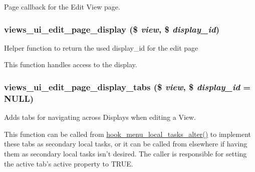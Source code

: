 \label{admin_8inc_ac6af463750fb21984d42b858c446635c}
Page callback for the Edit View page. \hypertarget{admin_8inc_a045ae05a3c8355d168425698b57a44ad}{
\subsubsection[{views\_\-ui\_\-edit\_\-page\_\-display}]{\setlength{\rightskip}{0pt plus 5cm}views\_\-ui\_\-edit\_\-page\_\-display (\$ {\em view}, \/  \$ {\em display\_\-id})}}
\label{admin_8inc_a045ae05a3c8355d168425698b57a44ad}
Helper function to return the used display\_\-id for the edit page

This function handles access to the display. \hypertarget{admin_8inc_af68377c9cd423a44378278947ce082c0}{
\subsubsection[{views\_\-ui\_\-edit\_\-page\_\-display\_\-tabs}]{\setlength{\rightskip}{0pt plus 5cm}views\_\-ui\_\-edit\_\-page\_\-display\_\-tabs (\$ {\em view}, \/  \$ {\em display\_\-id} = {\ttfamily NULL})}}
\label{admin_8inc_af68377c9cd423a44378278947ce082c0}
Adds tabs for navigating across Displays when editing a View.

This function can be called from \hyperlink{group__hooks_gac828fb6b28f1a8bb01c444a9b2331f5f}{hook\_\-menu\_\-local\_\-tasks\_\-alter()} to implement these tabs as secondary local tasks, or it can be called from elsewhere if having them as secondary local tasks isn't desired. The caller is responsible for setting the active tab's active property to TRUE.


